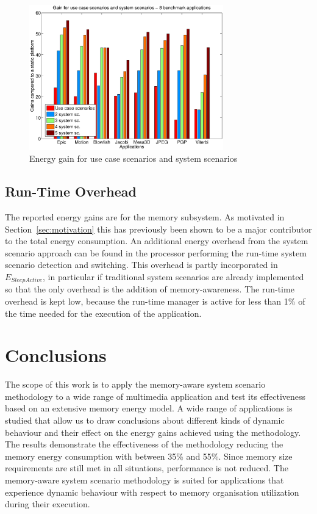 \documentclass[smallcondensed]{svjour3}
\begin{document}
\begin{figure}
\centering
\includegraphics[width=0.75\textwidth]{Images/usecase.eps}
\caption{Energy gain for use case scenarios and system scenarios}
\label{fig:usecase}
\end{figure}

\subsection{Run-Time Overhead}  

The reported energy gains are for the memory subsystem. 
As motivated in Section~\ref{sec:motivation} this has previously been shown to be a major contributor to the total energy consumption. 
An additional energy overhead from the system scenario approach can be found in the processor performing the run-time system scenario detection and switching. 
This overhead is partly incorporated in $E_{SleepActive}$, in particular if traditional system scenarios are already implemented so that the only overhead is the addition of memory-awareness.
The run-time overhead is kept low, because the run-time manager is active for less than 1\% of the time needed for the execution of the application. 

\section{Conclusions}
\label{sec:conclusion}

The scope of this work is to apply the memory-aware system scenario methodology to a wide range of multimedia application and test its effectiveness based on an extensive memory energy model. 
A wide range of applications is studied that allow us to draw conclusions about different kinds of dynamic behaviour and their effect on the energy gains achieved using the methodology. 
The results demonstrate the effectiveness of the methodology reducing the memory energy consumption with between 35\% and 55\%. 
Since memory size requirements are still met in all situations, performance is not reduced. 
The memory-aware system scenario methodology is suited for applications that experience dynamic behaviour with respect to memory organisation utilization during their execution.
\end{document}
